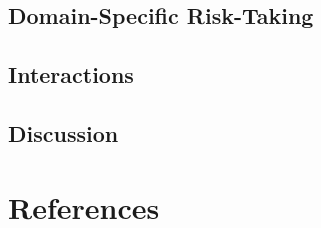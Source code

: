 \documentclass[
  donotrepeattitle,doc, 12pt, a4paper,floatsintext]{apa7}
\begin{document}
\hypertarget{domain-specific-risk-taking-3}{%
\subsection{Domain-Specific Risk-Taking}\label{domain-specific-risk-taking-3}}

\hypertarget{interactions-3}{%
\subsection{Interactions}\label{interactions-3}}

\hypertarget{discussion-2}{%
\subsection{Discussion}\label{discussion-2}}

\newpage

\hypertarget{references}{%
\section{References}\label{references}}

\begingroup
\setlength{\parindent}{-0.5in}
\setlength{\leftskip}{0.5in}
\end{document}
